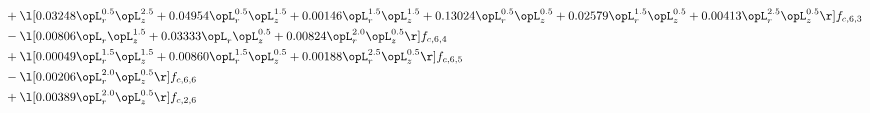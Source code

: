 \begin{alignat}{2}
& + \l[  0.03248 \opL_r^{0.5} \opL_z^{2.5} +  0.04954 \opL_r^{0.5} \opL_z^{1.5} +  0.00146 \opL_r^{1.5} \opL_z^{1.5} +  0.13024 \opL_r^{0.5} \opL_z^{0.5} +  0.02579 \opL_r^{1.5} \opL_z^{0.5} +  0.00413 \opL_r^{2.5} \opL_z^{0.5}  \r] f_{c,6,3} \nonumber \\ 
& - \l[  0.00806 \opL_r \opL_z^{1.5} +  0.03333 \opL_r \opL_z^{0.5} +  0.00824 \opL_r^{2.0} \opL_z^{0.5}  \r] f_{c,6,4} \nonumber \\ 
& + \l[  0.00049 \opL_r^{1.5} \opL_z^{1.5} +  0.00860 \opL_r^{1.5} \opL_z^{0.5} +  0.00188 \opL_r^{2.5} \opL_z^{0.5}  \r] f_{c,6,5} \nonumber \\ 
& - \l[  0.00206 \opL_r^{2.0} \opL_z^{0.5}  \r] f_{c,6,6} \nonumber \\ 
& + \l[  0.00389 \opL_r^{2.0} \opL_z^{0.5}  \r] f_{c,2,6} \nonumber \\ 
\end{alignat} 


